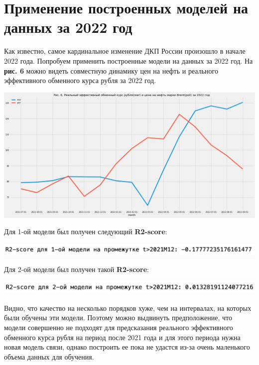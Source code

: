 \documentclass{article}
\begin{document}
\section{Применение построенных моделей на данных за 2022 год}
Как известно, самое кардинальное изменение ДКП России произошло в начале 2022 года. Попробуем применить построенные модели на данных за 2022 год. На \textbf{рис. 6} можно видеть совместную динамику цен на нефть и реального эффективного обменного курса рубля за 2022 год. 

\begin{center}
\includegraphics[width=150mm]{pics/reer_poil_2022.png}
\end{center}

Для 1-ой модели был получен следующий \textbf{R2-score}:

\begin{center}
\includegraphics[width=150mm]{pics/r2_1.png}
\end{center}

Для 2-ой модели был получен такой \textbf{R2-score}:

\begin{center}
\includegraphics[width=150mm]{pics/r2_2.png}
\end{center}

Видно, что качество на несколько порядков хуже, чем на интервалах, на которых были обучены эти модели. Поэтому можно выдвинуть предположение, что модели совершенно не подходят для предсказания реального эффективного обменного курса рубля на период после 2021 года и для этого периода нужна новая модель связи, однако построить ее пока не удастся из-за очень маленького объема данных для обучения.
\end{document}
